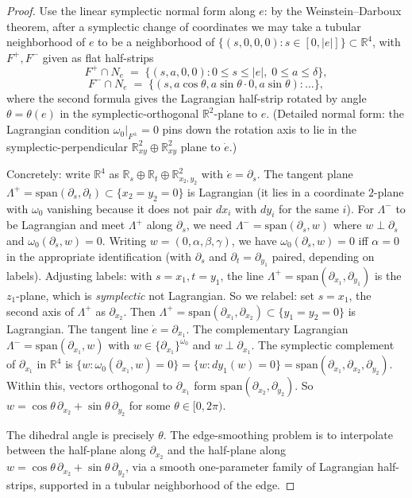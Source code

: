 \documentclass[12pt]{article}
\theoremstyle{definition}
\begin{document}
\begin{proof}
Use the linear symplectic normal form along $e$: by the Weinstein--Darboux theorem, after a symplectic change of coordinates we may take a tubular neighborhood of $e$ to be a neighborhood of $\{(s,0,0,0):s\in[0,|e|]\}\subset\mathbb{R}^4$, with $F^+,F^-$ given as flat half-strips
\[
F^+ \cap N_e \;=\; \{(s,a,0,0):0\leq s\leq|e|,\;0\leq a\leq\delta\},
\]
\[
F^-\cap N_e \;=\; \bigl\{(s,a\cos\theta,a\sin\theta\cdot 0,a\sin\theta):\dots\bigr\},
\]
where the second formula gives the Lagrangian half-strip rotated by angle $\theta=\theta(e)$ in the symplectic-orthogonal $\mathbb{R}^2$-plane to $e$. (Detailed normal form: the Lagrangian condition $\omega_0|_{F^\pm}=0$ pins down the rotation axis to lie in the symplectic-perpendicular $\mathbb{R}^2_{xy}\oplus\mathbb{R}^2_{xy}$ plane to $\dot e$.)

Concretely: write $\mathbb{R}^4$ as $\mathbb{R}_s\oplus\mathbb{R}_t\oplus\mathbb{R}^2_{x_2,y_2}$ with $\dot e=\partial_s$. The tangent plane $\Lambda^+=\mathrm{span}(\partial_s,\partial_t)\subset\{x_2=y_2=0\}$ is Lagrangian (it lies in a coordinate $2$-plane with $\omega_0$ vanishing because it does not pair $dx_i$ with $dy_i$ for the same $i$).
For $\Lambda^-$ to be Lagrangian and meet $\Lambda^+$ along $\partial_s$, we need $\Lambda^-=\mathrm{span}(\partial_s,w)$ where $w\perp\partial_s$ and $\omega_0(\partial_s,w)=0$. Writing $w=(0,\alpha,\beta,\gamma)$, we have $\omega_0(\partial_s,w)=0$ iff $\alpha=0$ in the appropriate identification (with $\partial_s$ and $\partial_t=\partial_{y_1}$ paired, depending on labels). Adjusting labels: with $s=x_1,t=y_1$, the line $\Lambda^+=\mathrm{span}(\partial_{x_1},\partial_{y_1})$ is the $z_1$-plane, which is \emph{symplectic} not Lagrangian. So we relabel: set $s=x_1$, the second axis of $\Lambda^+$ as $\partial_{x_2}$. Then $\Lambda^+=\mathrm{span}(\partial_{x_1},\partial_{x_2})\subset\{y_1=y_2=0\}$ is Lagrangian. The tangent line $\dot e=\partial_{x_1}$. The complementary Lagrangian $\Lambda^-=\mathrm{span}(\partial_{x_1},w)$ with $w\in\{\partial_{x_1}\}^{\omega_0}$ and $w\perp\partial_{x_1}$. The symplectic complement of $\partial_{x_1}$ in $\mathbb{R}^4$ is $\{w:\omega_0(\partial_{x_1},w)=0\}=\{w:dy_1(w)=0\}=\mathrm{span}(\partial_{x_1},\partial_{x_2},\partial_{y_2})$. Within this, vectors orthogonal to $\partial_{x_1}$ form $\mathrm{span}(\partial_{x_2},\partial_{y_2})$. So $w=\cos\theta\,\partial_{x_2}+\sin\theta\,\partial_{y_2}$ for some $\theta\in[0,2\pi)$.

The dihedral angle is precisely $\theta$. The edge-smoothing problem is to interpolate between the half-plane along $\partial_{x_2}$ and the half-plane along $w=\cos\theta\,\partial_{x_2}+\sin\theta\,\partial_{y_2}$, via a smooth one-parameter family of Lagrangian half-strips, supported in a tubular neighborhood of the edge.


\end{proof}
\end{document}
